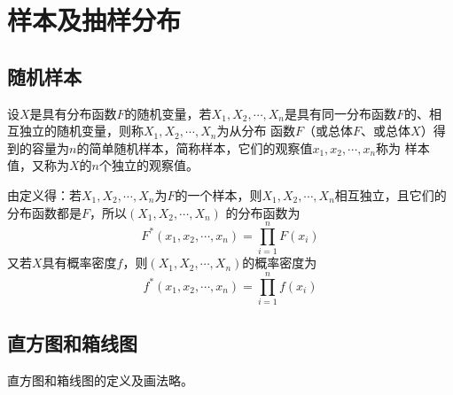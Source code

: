 \section{样本及抽样分布}
\subsection{随机样本}

\begin{definition}
    设$X$是具有分布函数$F$的随机变量，若$X_1,X_2,\cdots,X_n$是具有同一分布函数$F$的、相互独立的随机变量，则称$X_1,X_2,\cdots,X_n$为从分布
    函数$F$（或总体$F$、或总体$X$）得到的{\heiti 容量为$n$的简单随机样本}，简称{\heiti 样本}，它们的观察值$x_1,x_2,\cdots,x_n$称为
    {\heiti 样本值}，又称为$X$的$n$个{\heiti 独立的观察值}。

    由定义得：若$X_1,X_2,\cdots,X_n$为$F$的一个样本，则$X_1,X_2,\cdots,X_n$相互独立，且它们的分布函数都是$F$，所以$(X_1,X_2,\cdots,X_n)$
    的分布函数为
    $$F^\ast(x_1,x_2,\cdots,x_n)=\prod _{i=1}^n F(x_i)$$
    又若$X$具有概率密度$f$，则$(X_1,X_2,\cdots,X_n)$的概率密度为
    $$f^\ast(x_1,x_2,\cdots,x_n)=\prod _{i=1}^n f(x_i)$$
\end{definition}

\subsection{直方图和箱线图}
直方图和箱线图的定义及画法略。

